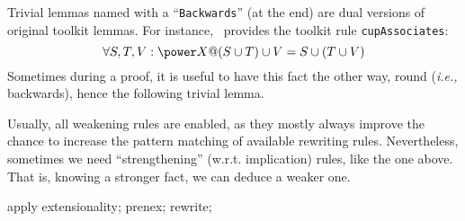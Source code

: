 
Trivial lemmas named with a ``\texttt{Backwards}'' (at the end)
are dual versions of original toolkit lemmas. For instance, \zeves\
provides the toolkit rule \texttt{cupAssociates}:
%
\[
  \forall S, T, V: \power  X @ (S \cup  T) \cup  V = S \cup  (T \cup  V)
\]
%
Sometimes during a proof, it is useful to have this fact the other
way, round (\textit{i.e.,} backwards), hence the following trivial lemma.
%


%
Usually, all weakening rules are enabled, as they mostly
always improve the chance to increase the pattern matching
of available rewriting rules. Nevertheless, sometimes we
need ``strengthening'' (w.r.t. implication) rules, like the one above.
That is, knowing a stronger fact, we can deduce a weaker one.







\begin{LPScript}\begin{forget}[lRightDiffLeftDistribute]
apply extensionality;
prenex;
rewrite;
\end{forget}\end{LPScript}

